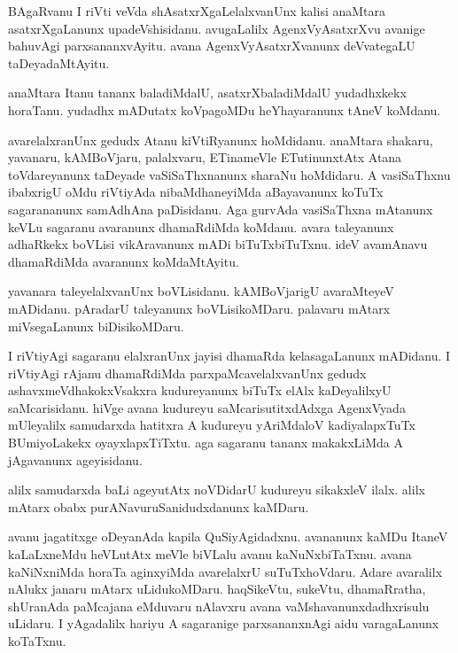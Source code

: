 \documentclass{article}
\begin{document}
\begin{mn}%
BAgaRvanu I riVti veVda shAsatxrXgaLelalxvanUnx kalisi  anaMtara asatxrXgaLanunx 
upadeVshisidanu. avugaLalilx AgenxVyAsatxrXvu avanige bahuvAgi parxsananxvAyitu. avana 
AgenxVyAsatxrXvanunx deVvategaLU taDeyadaMtAyitu.
\end{mn}

\begin{mn}%
anaMtara Itanu tananx baladiMdalU, asatxrXbaladiMdalU yudadhxkekx horaTanu. yudadhx mADutatx 
koVpagoMDu heYhayaranunx tAneV koMdanu.
\end{mn}

\begin{mn}%
avarelalxranUnx gedudx Atanu kiVtiRyanunx hoMdidanu. anaMtara shakaru, yavanaru, kAMBoVjaru, 
palalxvaru, ETinameVle ETutinunxtAtx Atana toVdareyanunx taDeyade vaSiSaThxnanunx sharaNu 
hoMdidaru. A vasiSaThxnu ibabxrigU oMdu riVtiyAda nibaMdhaneyiMda aBayavanunx koTuTx 
sagarananunx samAdhAna paDisidanu. Aga gurvAda vasiSaThxna mAtanunx keVLu sagaranu 
avaranunx dhamaRdiMda koMdanu. avara taleyanunx adhaRkekx boVLisi vikAravanunx mADi 
biTuTxbiTuTxnu. ideV avamAnavu dhamaRdiMda avaranunx koMdaMtAyitu. 
\end{mn}

\begin{mn}%
yavanara taleyelalxvanUnx boVLisidanu. kAMBoVjarigU avaraMteyeV mADidanu. pAradarU 
taleyanunx boVLisikoMDaru. palavaru mAtarx miVsegaLanunx biDisikoMDaru.
\end{mn}

\begin{mn}%
I riVtiyAgi sagaranu elalxranUnx jayisi dhamaRda kelasagaLanunx mADidanu. I riVtiyAgi rAjanu 
dhamaRdiMda parxpaMcavelalxvanUnx gedudx ashavxmeVdhakokxVsakxra kudureyanunx biTuTx elAlx 
kaDeyalilxyU saMcarisidanu. hiVge avana kudureyu saMcarisutitxdAdxga AgenxVyada mUleyalilx 
samudarxda hatitxra A kudureyu yAriMdaloV kadiyalapxTuTx BUmiyoLakekx oyayxlapxTiTxtu. aga 
sagaranu tananx makakxLiMda A jAgavanunx ageyisidanu.
\end{mn}

\begin{mn}%
alilx samudarxda baLi ageyutAtx noVDidarU kudureyu sikakxleV ilalx. alilx mAtarx obabx 
purANavuruSanidudxdanunx kaMDaru.
\end{mn}

\begin{mn}%
avanu jagatitxge oDeyanAda kapila QuSiyAgidadxnu. avananunx kaMDu ItaneV kaLaLxneMdu 
heVLutAtx meVle biVLalu avanu kaNuNxbiTaTxnu. avana kaNiNxniMda horaTa aginxyiMda 
avarelalxrU suTuTxhoVdaru. Adare avaralilx nAlukx janaru mAtarx uLidukoMDaru. haqSikeVtu, 
sukeVtu, dhamaRratha, shUranAda paMcajana eMduvaru nAlavxru avana vaMshavanunxdadhxrisulu 
uLidaru. I yAgadalilx hariyu A sagaranige parxsananxnAgi aidu varagaLanunx koTaTxnu.
\end{mn}
\end{document}
